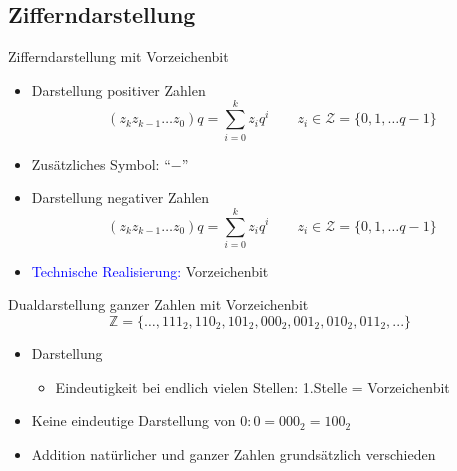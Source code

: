 \documentclass[12pt%
,aspectratio=169%
]{beamer}
\begin{document}
\subsection{Zifferndarstellung}
\begin{frame}{Zifferndarstellung mit Vorzeichenbit}
\begin{itemize}
	\item Darstellung positiver Zahlen
	$$
		(z_k z_{k-1} \ldots z_0)q = \sum_{i = 0}^k z_i q^i \qquad z_i \in \mathcal{Z}= \{0,1, \ldots q-1 \}
	$$
	\item Zusätzliches Symbol: \enquote{$-$}
	\item Darstellung negativer Zahlen
	$$
		(z_k z_{k-1} \ldots z_0)q = \sum_{i = 0}^k z_i q^i \qquad z_i \in \mathcal{Z}= \{0,1, \ldots q-1 \}
	$$
	\item \textcolor{blue}{Technische Realisierung:} Vorzeichenbit
\end{itemize}
\end{frame}

\begin{frame}{Dualdarstellung ganzer Zahlen mit Vorzeichenbit}
$$
	\mathbb{Z} = \{ \ldots , 111_2 , 110_2 , 101_2 , 000_2 , 001_2 , 010_2 , 011_2 , . . . \}
$$
\begin{itemize}
	\item Darstellung
	\begin{itemize}
		\item Eindeutigkeit bei endlich vielen Stellen: 1.Stelle = Vorzeichenbit
	\end{itemize}
	\item Keine eindeutige Darstellung von $0: 0 = 000_2 = 100_2$
	\item Addition natürlicher und ganzer Zahlen grundsätzlich verschieden
\end{itemize}
\end{frame}
\end{document}
